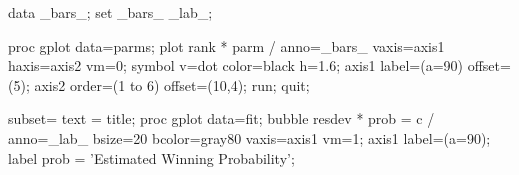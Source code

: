 \begin{listing}
data _bars_;
   set _bars_ _lab_;

proc gplot data=parms;
   plot rank * parm / 
      anno=_bars_ vaxis=axis1 haxis=axis2 vm=0;
   symbol v=dot color=black h=1.6;
   axis1 label=(a=90) offset=(5);
    axis2 order=(1 to 6) offset=(10,4);
run; quit;

   subset=%
   text = %
title;
proc gplot data=fit;
   bubble resdev * prob = c /
      anno=_lab_ bsize=20 bcolor=gray80 vaxis=axis1 vm=1;
   axis1 label=(a=90);
   label prob = 'Estimated Winning Probability';
\end{listing}
